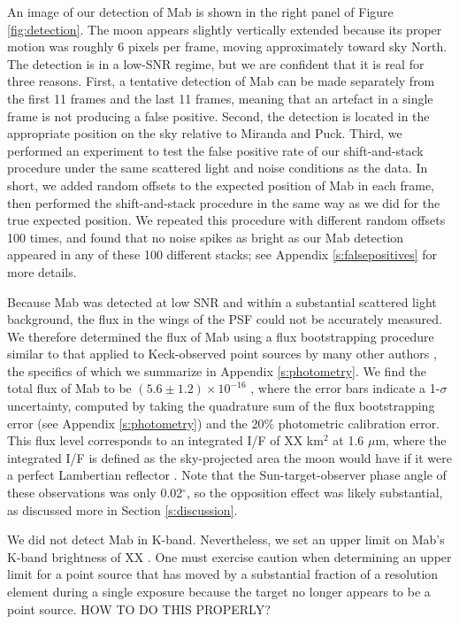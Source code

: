 \documentclass[preprint]{aastex631}
\begin{document}
An image of our detection of Mab is shown in the right panel of Figure \ref{fig:detection}. The moon appears slightly vertically extended because its proper motion was roughly 6 pixels per frame, moving approximately toward sky North. The detection is in a low-SNR regime, but we are confident that it is real for three reasons. First, a tentative detection of Mab can be made separately from the first 11 frames and the last 11 frames, meaning that an artefact in a single frame is not producing a false positive. Second, the detection is located in the appropriate position on the sky relative to Miranda and Puck. Third, we performed an experiment to test the false positive rate of our shift-and-stack procedure under the same scattered light and noise conditions as the data. In short, we added random offsets to the expected position of Mab in each frame, then performed the shift-and-stack procedure in the same way as we did for the true expected position. We repeated this procedure with different random offsets 100 times, and found that no noise spikes as bright as our Mab detection appeared in any of these 100 different stacks; see Appendix \ref{s:falsepositives} for more details.

Because Mab was detected at low SNR and within a substantial scattered light background, the flux in the wings of the PSF could not be accurately measured. We therefore determined the flux of Mab using a flux bootstrapping procedure similar to that applied to Keck-observed point sources by many other authors \citep[e.g.,]{gibbard05, molter19, paradis23}, the specifics of which we summarize in Appendix \ref{s:photometry}. We find the total flux of Mab to be $(5.6 \pm 1.2)\times10^{-16}$ \ergsec, where the error bars indicate a 1-$\sigma$ uncertainty, computed by taking the quadrature sum of the flux bootstrapping error (see Appendix \ref{s:photometry}) and the 20\% photometric calibration error. This flux level corresponds to an integrated I/F of XX km$^2$ at 1.6 $\mu$m, where the integrated I/F is defined as the sky-projected area the moon would have if it were a perfect Lambertian reflector \citep[i.e., a geometric albedo of unity][]{karkoschka01}. Note that the Sun-target-observer phase angle of these observations was only 0.02$^\circ$, so the opposition effect was likely substantial, as discussed more in Section \ref{s:discussion}. 

We did not detect Mab in K-band. Nevertheless, we set an upper limit on Mab's K-band brightness of 
XX \ergsec. One must exercise caution when determining an upper limit for a point source that has moved by a substantial fraction of a resolution element during a single exposure because the target no longer appears to be a point source. HOW TO DO THIS PROPERLY?
\end{document}
